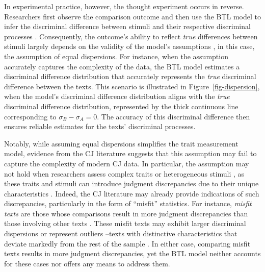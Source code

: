 \documentclass[
  authoryear,
  review,
  1p]{elsarticle}
\begin{document}
In experimental practice, however, the thought experiment occurs in
reverse. Researchers first observe the comparison outcome and then use
the BTL model to infer the discriminal difference between stimuli and
their respective discriminal processes \citep[pp.~373]{Thurstone_1927a}.
Consequently, the outcome's ability to reflect \emph{true} differences
between stimuli largely depends on the validity of the model's
assumptions \citep[pp.~150]{Kohler_et_al_2019}, in this case, the
assumption of equal dispersions. For instance, when the assumption
accurately captures the complexity of the data, the BTL model estimates
a discriminal difference distribution that accurately represents the
\emph{true} discriminal difference between the texts. This scenario is
illustrated in Figure~\ref{fig-dispersion}, when the model's discriminal
difference distribution aligns with the \emph{true} discriminal
difference distribution, represented by the thick continuous line
corresponding to \(\sigma_{B}-\sigma_{A}=0\). The accuracy of this
discriminal difference then ensures reliable estimates for the texts'
discriminal processes.

Notably, while assuming equal dispersions simplifies the trait
measurement model, evidence from the CJ literature suggests that this
assumption may fail to capture the complexity of modern CJ data. In
particular, the assumption may not hold when researchers assess complex
traits or heterogeneous stimuli
\citetext{\citealp[pp.~376]{Thurstone_1927a}; \citealp[pp.~273]{Bramley_2008}; \citealp[pp.~678]{Kelly_et_al_2022}},
as these traits and stimuli can introduce judgment discrepancies due to
their unique characteristics
\citep{vanDaal_et_al_2016, Lesterhuis_2018, Chambers_et_al_2022}.
Indeed, the CJ literature may already provide indications of such
discrepancies, particularly in the form of ``misfit'' statistics. For
instance, \emph{misfit texts} are those whose comparisons result in more
judgment discrepancies than those involving other texts
\citetext{\citealp[pp.~11]{Pollitt_2004}; \citealp[pp.~290]{Pollitt_2012b}}.
These misfit texts may exhibit larger discriminal dispersions or
represent outliers --texts with distinctive characteristics that deviate
markedly from the rest of the sample \citep{Grubbs_1969}. In either
case, comparing misfit texts results in more judgment discrepancies, yet
the BTL model neither accounts for these cases nor offers any means to
address them.
\end{document}

